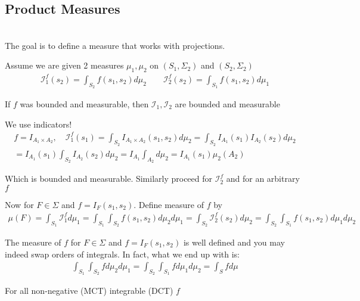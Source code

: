 \subsection{Product Measures}\hfill\\
\noindent The goal is to define a measure that works with projections.\par
\noindent Assume we are given 2 measures $\mu_1,\mu_2$ on $(S_1,\Sigma_2)$ and $(S_2,\Sigma_2)$
\begin{equation*}
  \begin{gathered}
    \mathcal{I}_1^f(s_2) = \int_{S_2}f(s_1,s_2)d\mu_2\qquad\mathcal{I}_2^f(s_2) = \int_{S_1}f(s_1,s_2)d\mu_1
  \end{gathered}
\end{equation*}
\par\bigskip
\begin{lem}[]{}
  If $f$ was bounded and measurable, then $\mathcal{I}_1,\mathcal{I}_2$ are bounded and measurable
\end{lem}
\par\bigskip
\begin{prf}[]{}
  We use indicators!
  \begin{equation*}
    \begin{gathered}
      f = I_{A_1\times A_2},\quad \mathcal{I}_1^f(s_1) = \int_{S_2}I_{A_1\times A_2}(s_1,s_2)d\mu_2 = \int_{S_2}I_{A_1}(s_1)I_{A_2}(s_2)d\mu_2\\
      = I_{A_1}(s_1)\int_{S_2}I_{A_2}(s_2)d\mu_2 = I_{A_1}\int_{A_2}d\mu_2 = I_{A_1}(s_1)\mu_2(A_2)
    \end{gathered}
  \end{equation*}\par
  \noindent Which is bounded and measurable. Similarly proceed for $\mathcal{I}_2^f$ and for an arbitrary $f$
\end{prf}
\par\bigskip
\noindent Now for $F\in\Sigma$ and $f = I_{F}(s_1,s_2)$. Define measure of $f$  by
\begin{equation*}
  \begin{gathered}
    \mu(F) = \int_{S_1}\mathcal{I}_1^fd\mu_1 = \int_{S_1}\int_{S_2}f(s_1,s_2)d\mu_2d\mu_1 = \int_{S_2}\mathcal{I}_2^f(s_2)d\mu_2 = \int_{S_2}\int_{S_1}f(s_1,s_2)d\mu_1d\mu_2
  \end{gathered}
\end{equation*}
\par\bigskip
\begin{theo}[Fubinis]{}
  The measure of $f$ for $F\in\Sigma$ and $f = I_{F}(s_1,s_2)$ is well defined and you may indeed swap orders of integrals. In fact, what we end up with is:
  \begin{equation*}
    \begin{gathered}
      \int_{S_1}\int_{S_2}fd\mu_2d\mu_1 = \int_{S_2}\int_{S_1}fd\mu_1d\mu_2 =\int_S fd\mu
    \end{gathered}
  \end{equation*}\par
  \noindent For all non-negative (MCT) integrable (DCT) $f$
\end{theo}
